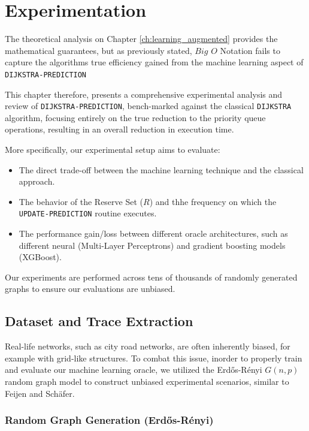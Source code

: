 \chapter{Experimentation}
\label{ch:experimentation}
The theoretical analysis on Chapter \ref{ch:learning_augmented} provides the mathematical guarantees, but as previously stated, $Big$ $O$ Notation fails to capture the algorithms true efficiency gained from the machine learning aspect of \texttt{DIJKSTRA-PREDICTION}

This chapter therefore, presents a comprehensive experimental analysis and review of \texttt{DIJKSTRA-PREDICTION}, bench-marked against the classical \texttt{DIJKSTRA} algorithm, focusing entirely on the true reduction to the priority queue operations, resulting in an overall reduction in execution time.

More specifically, our experimental setup aims to evaluate:
\begin{itemize}
    \item The direct trade-off between the machine learning technique and the classical approach.
    \item The behavior of the Reserve Set ($R$) and thhe frequency on which the \texttt{UPDATE-PREDICTION} routine executes.
    \item The performance gain/loss between different oracle architectures, such as different neural (Multi-Layer Perceptrons) and gradient boosting models (XGBoost).
\end{itemize}

Our experiments are performed across tens of thousands of randomly generated graphs to ensure our evaluations are unbiased.
\newpage

\section{Dataset and Trace Extraction}
\label{sec:dataset}
Real-life networks, such as city road networks, are often inherently biased, for example with grid-like structures. To combat this issue, inorder to properly train and evaluate our machine learning oracle, we utilized the Erdős-Rényi\cite{erdos1960evolution} $G(n, p)$ random graph model to construct unbiased experimental scenarios, similar to Feijen and Schäfer\cite{feijenDijkstrasAlgorithmPredictions2023}. 


\subsection{Random Graph Generation (Erdős-Rényi)}
\label{subsec:erdos_renyi}

